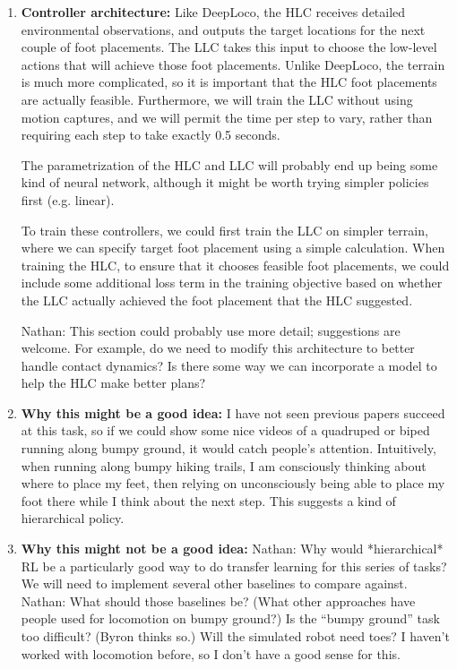 \documentclass[a4paper]{article}
\newcommand{\nhatch}[1]{{\leavevmode\color{blue} Nathan: #1}}
\begin{document}
\begin{enumerate}
\item \textbf{Controller architecture:}
  Like DeepLoco, the HLC receives detailed environmental observations, and outputs the target locations for the next couple of foot placements.
  The LLC takes this input to choose the low-level actions that will achieve those foot placements.
  Unlike DeepLoco, the terrain is much more complicated, so it is important that the HLC foot placements are actually feasible.
  Furthermore, we will train the LLC without using motion captures, and we will permit the time per step to vary, rather than requiring each step to take exactly 0.5 seconds.

  The parametrization of the HLC and LLC will probably end up being some kind of neural network, although it might be worth trying simpler policies first (e.g. linear).

  To train these controllers, we could first train the LLC on simpler terrain, where we can specify target foot placement using a simple calculation.
  When training the HLC, to ensure that it chooses feasible foot placements, we could include some additional loss term in the training objective based on whether the LLC actually achieved the foot placement that the HLC suggested.

\nhatch{This section could probably use more detail; suggestions are welcome.
For example, do we need to modify this architecture to better handle contact dynamics?
Is there some way we can incorporate a model to help the HLC make better plans?}

\item \textbf{Why this might be a good idea:}
I have not seen previous papers succeed at this task, so if we could show some nice videos of a quadruped or biped running along bumpy ground, it would catch people's attention.
Intuitively, when running along bumpy hiking trails, I am consciously thinking about where to place my feet, then relying on unconsciously being able to place my foot there while I think about the next step.
This suggests a kind of hierarchical policy.

\item \textbf{Why this might not be a good idea:}
  \nhatch{Why would *hierarchical* RL be a particularly good way to do transfer learning for this series of tasks?}
  We will need to implement several other baselines to compare against.
  \nhatch{What should those baselines be? (What other approaches have people used for locomotion on bumpy ground?)
Is the ``bumpy ground'' task too difficult? (Byron thinks so.)
Will the simulated robot need toes?}
I haven't worked with locomotion before, so I don't have a good sense for this.

\end{enumerate}




\end{document}
